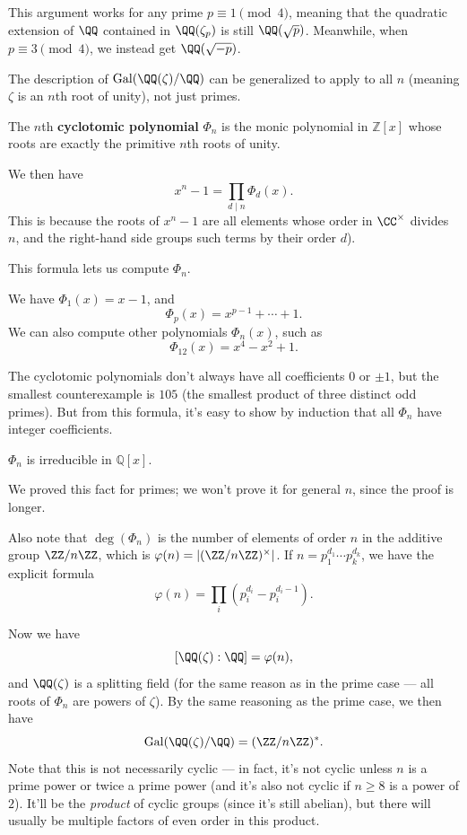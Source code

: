 \begin{note}
    This argument works for any prime $p \equiv 1 \pmod{4}$, meaning that the quadratic extension of $\QQ$ contained in $\QQ(\zeta_p)$ is still $\QQ(\sqrt{p})$. Meanwhile, when $p \equiv 3 \pmod{4}$, we instead get $\QQ(\sqrt{-p})$. 
\end{note}

The description of $\operatorname{Gal}(\QQ(\zeta)/\QQ)$ can be generalized to apply to all $n$ (meaning $\zeta$ is an $n$th root of unity), not just primes. 

\begin{definition}
    The $n$th \textbf{cyclotomic polynomial} $\Phi_n$ is the monic polynomial in $\mathbb{Z}[x]$ whose roots are exactly the primitive $n$th roots of unity.
\end{definition}

We then have \[x^n - 1 = \prod_{d \mid n} \Phi_d(x).\] This is because the roots of $x^n - 1$ are all elements whose order in $\CC^\times$ divides $n$, and the right-hand side groups such terms by their order $d$). 

This formula lets us compute $\Phi_n$. 

\begin{example}
    We have $\Phi_1(x) = x - 1$, and \[\Phi_p(x) = x^{p - 1} + \cdots + 1.\] We can also compute other polynomials $\Phi_n(x)$, such as \[\Phi_{12}(x) = x^4 - x^2 + 1.\] 
\end{example}

The cyclotomic polynomials don't always have all coefficients $0$ or $\pm 1$, but the smallest counterexample is $105$ (the smallest product of three distinct odd primes). But from this formula, it's easy to show by induction that all $\Phi_n$ have integer coefficients. 

\begin{fact}
    $\Phi_n$ is irreducible in $\mathbb{Q}[x]$. 
\end{fact}

We proved this fact for primes; we won't prove it for general $n$, since the proof is longer. 


Also note that $\deg(\Phi_n)$ is the number of elements of order $n$ in the additive group $\ZZ/n\ZZ$, which is $\varphi(n) = \lvert (\ZZ/n\ZZ)^\times \rvert$. If $n = p_1^{d_1}\cdots p_k^{d_k}$, we have the explicit formula \[\varphi(n) = \prod_i (p_i^{d_i} - p_i^{d_i - 1}).\] 

Now we have \[[\QQ(\zeta) : \QQ] = \varphi(n),\] and $\QQ(\zeta)$ is a splitting field (for the same reason as in the prime case --- all roots of $\Phi_n$ are powers of $\zeta$). By the same reasoning as the prime case, we then have \[\operatorname{Gal}(\QQ(\zeta)/\QQ) = (\ZZ/n\ZZ)^*.\] Note that this is not necessarily cyclic --- in fact, it's not cyclic unless $n$ is a prime power or twice a prime power (and it's also not cyclic if $n \geq 8$ is a power of $2$). It'll be the \emph{product} of cyclic groups (since it's still abelian), but there will usually be multiple factors of even order in this product. 

